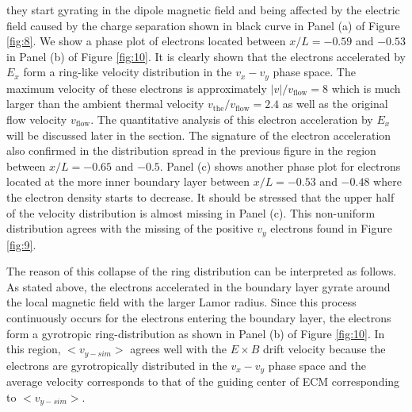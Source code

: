 \documentclass[draft,jgrga]{agutex2015}
\begin{document}
\begin{article}
they start gyrating in the dipole magnetic field and being 
affected by the electric field caused by the charge separation
shown in black curve in Panel (a) of Figure \ref{fig:8}.
We show a phase plot of electrons located between 
$x/L = -0.59$ and $-0.53$ in Panel (b) of Figure \ref{fig:10}.
It is clearly shown that the electrons accelerated by $E_x$ form 
a ring-like velocity distribution in the $v_x-v_y$ phase space.
The maximum velocity of these electrons is approximately 
$|v|/v_\mathrm{flow} = 8$ which is much larger than 
the ambient thermal velocity $v_{\mathrm{the}}/v_\mathrm{flow} = 2.4$ 
as well as the original flow velocity $v_\mathrm{flow}$.
The quantitative analysis of this electron acceleration by $E_x$ will be
discussed later in the section.
%
The signature of the electron acceleration
also confirmed in the distribution spread in the previous figure
in the region between $x/L =-0.65$ and $-0.5$.
Panel (c) shows another phase plot for electrons located at the more inner boundary
layer between $x/L = -0.53$ and $-0.48$ 
where the electron density starts to decrease.
It should be stressed that 
the upper half of the velocity distribution is almost missing in Panel (c).
This non-uniform distribution agrees with the missing of the positive $v_y$ 
electrons found in Figure \ref{fig:9}.

The reason of this collapse of the ring distribution can be interpreted 
as follows.
As stated above, the electrons accelerated in the boundary layer
gyrate around the local magnetic field with the larger Lamor radius.
Since this process continuously occurs for the electrons 
entering the boundary layer,
the electrons form a gyrotropic ring-distribution
as shown in Panel (b) of Figure \ref{fig:10}.
In this region, 
$<v_{y-sim}>$ agrees well with the $E \times B$ drift velocity 
because the electrons are gyrotropically 
distributed in the $v_x-v_y$ phase space and the average velocity 
corresponds to that of the guiding center of ECM corresponding to $<v_{y-sim}>$.


\end{article}
\end{document}

